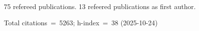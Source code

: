 75 refereed publications. 13 refeered publications as first author.

Total citations~=~5263; h-index~=~38 (2025-10-24)